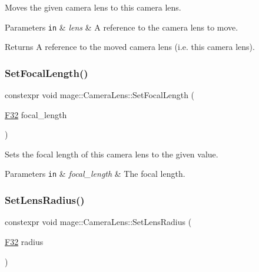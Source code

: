 Moves the given camera lens to this camera lens.


\begin{DoxyParams}[1]{Parameters}
\mbox{\tt in}  & {\em lens} & A reference to the camera lens to move. \\
\hline
\end{DoxyParams}
\begin{DoxyReturn}{Returns}
A reference to the moved camera lens (i.\+e. this camera lens). 
\end{DoxyReturn}
\hypertarget{classmage_1_1_camera_lens_a9b6bf491697ac11bd236812148bb78ec}{}\label{classmage_1_1_camera_lens_a9b6bf491697ac11bd236812148bb78ec} 
\subsubsection{\texorpdfstring{Set\+Focal\+Length()}{SetFocalLength()}}
{\footnotesize\ttfamily constexpr void mage\+::\+Camera\+Lens\+::\+Set\+Focal\+Length (\begin{DoxyParamCaption}\item[{\hyperlink{namespacemage_aa97e833b45f06d60a0a9c4fc22ae02c0}{F32}}]{focal\+\_\+length }\end{DoxyParamCaption})\hspace{0.3cm}{\ttfamily [noexcept]}}

Sets the focal length of this camera lens to the given value.


\begin{DoxyParams}[1]{Parameters}
\mbox{\tt in}  & {\em focal\+\_\+length} & The focal length. \\
\hline
\end{DoxyParams}
\hypertarget{classmage_1_1_camera_lens_a3674a66ab5e10729978953407a616cd1}{}\label{classmage_1_1_camera_lens_a3674a66ab5e10729978953407a616cd1} 
\subsubsection{\texorpdfstring{Set\+Lens\+Radius()}{SetLensRadius()}}
{\footnotesize\ttfamily constexpr void mage\+::\+Camera\+Lens\+::\+Set\+Lens\+Radius (\begin{DoxyParamCaption}\item[{\hyperlink{namespacemage_aa97e833b45f06d60a0a9c4fc22ae02c0}{F32}}]{radius }\end{DoxyParamCaption})\hspace{0.3cm}{\ttfamily [noexcept]}}

